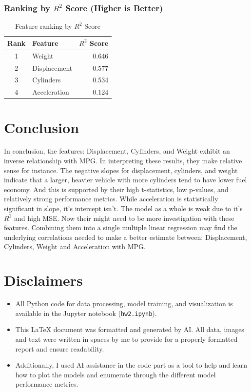 \documentclass[12pt]{article}
\begin{document}
\subsubsection{Ranking by $R^2$ Score (Higher is Better)}
\begin{table}[H]
\centering
\begin{tabular}{clr}
\toprule
\textbf{Rank} & \textbf{Feature} & \textbf{$R^2$ Score} \\
\midrule
1 & Weight & 0.646 \\
2 & Displacement & 0.577 \\
3 & Cylinders & 0.534 \\
4 & Acceleration & 0.124 \\
\bottomrule
\end{tabular}
\caption{Feature ranking by $R^2$ Score}
\label{tab:r2_ranking}
\end{table}

\section{Conclusion}
In conclusion, the features: Displacement, Cylinders, and Weight exhibit an inverse relationship with MPG. In interpreting these results, they make relative sense for instance. The negative slopes for displacement, cylinders, and weight indicate that a larger, heavier vehicle with more cylinders tend to have lower fuel economy. And this is supported by their high t-statistics, low p-values, and relatively strong performance metrics. While acceleration is statistically significant in slope, it's intercept isn't. The model as a whole is weak due to it's $R^2$ and high MSE. Now their might need to be more investigation with these features. Combining them into a single multiple linear regression may find the underlying correlations needed to make a better estimate between: Displacement, Cylinders, Weight and Acceleration with MPG. 

\section{Disclaimers}
\begin{itemize}
    \item All Python code for data processing, model training, and visualization is available in the Jupyter notebook (\texttt{hw2.ipynb}).
    
    \item This LaTeX document was formatted and generated by AI. All data, images and text were written in spaces by me to provide for a properly formatted report and ensure readability.

    \item Additionally, I used AI assistance in the code part as a tool to help and learn how to plot the models and enumerate through the different model performance metrics.
\end{itemize}
\end{document}
